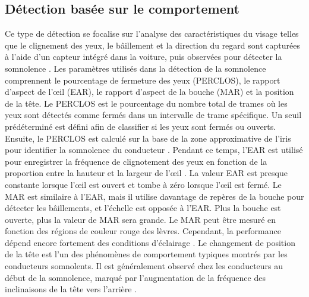 \subsection{Détection  basée sur le comportement}
Ce type de détection se focalise sur l'analyse des caractéristiques du visage telles que le clignement des yeux, le bâillement et la direction du regard sont capturées à l'aide d'un capteur intégré dans la voiture, puis observées pour détecter la somnolence\cite{vijayan2020comparative} . Les paramètres utilisés dans la détection de la somnolence comprennent le pourcentage de fermeture des yeux (PERCLOS), le rapport d'aspect de l'œil (EAR), le rapport d'aspect de la bouche (MAR) et la position de la tête. Le PERCLOS est le pourcentage du nombre total de trames où les yeux sont détectés comme fermés dans un intervalle de trame spécifique. Un seuil prédéterminé est défini afin de classifier si les yeux sont fermés ou ouverts. Ensuite, le PERCLOS est calculé sur la base de la zone approximative de l'iris pour identifier la somnolence du conducteur\cite{junaedi2018driver,zhang2017research} . Pendant ce temps, l'EAR est utilisé pour enregistrer la fréquence de clignotement des yeux en fonction de la proportion entre la hauteur et la largeur de l'œil\cite{maior2020real,you2019real2,soukupova2016eye} . La valeur EAR est presque constante lorsque l'œil est ouvert et tombe à zéro lorsque l'œil est fermé. Le MAR est similaire à l'EAR, mais il utilise davantage de repères de la bouche pour détecter les bâillements, et l'échelle est opposée à l'EAR. Plus la bouche est ouverte, plus la valeur de MAR sera grande\cite{houssaini2019real,mohanty2019design}. Le MAR peut être mesuré en fonction des régions de couleur rouge des lèvres. Cependant, la performance dépend encore fortement des conditions d'éclairage \cite{niloy2020brief}. Le changement de position de la tête est l'un des phénomènes de comportement typiques montrés par les conducteurs somnolents. Il est généralement observé chez les conducteurs au début de la somnolence, marqué par l'augmentation de la fréquence des inclinaisons de la tête vers l'arrière\cite{brandt2004affordable,dreissig2020driver} .

